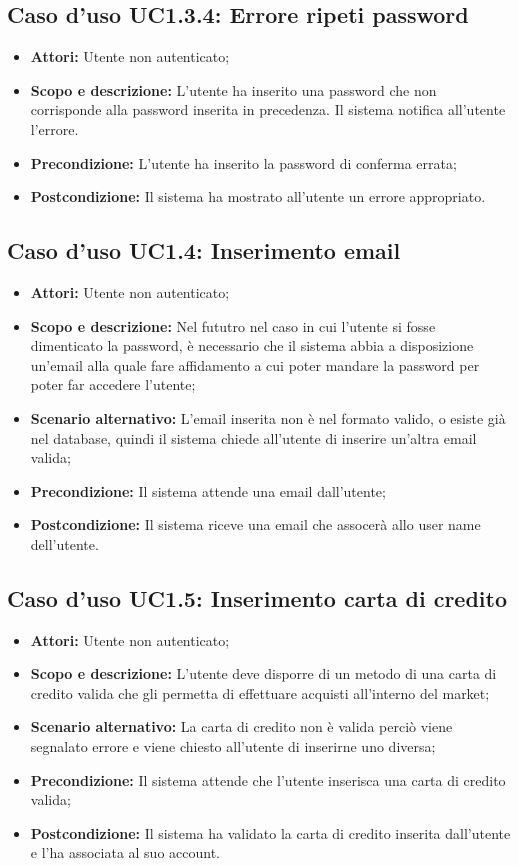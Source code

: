\documentclass[12pt,a4paper,titlepage]{article}
\begin{document}
	\subsection{Caso d'uso UC1.3.4: Errore ripeti password}
	\label{UC1.3.4}
	\begin{itemize}
		\item \textbf{Attori: }Utente non autenticato;
		\item \textbf{Scopo e descrizione: }L'utente ha inserito una password che non corrisponde alla password inserita in precedenza. Il sistema notifica all'utente l'errore.
		\item \textbf{Precondizione: }L'utente ha inserito la password di conferma errata;
		\item \textbf{Postcondizione: }Il sistema ha mostrato all'utente un errore appropriato.
	\end{itemize}
	\subsection{Caso d'uso UC1.4: Inserimento email}
	\label{UC1.4}
	\begin{itemize}
		\item \textbf{Attori: }Utente non autenticato;
		\item \textbf{Scopo e descrizione: }Nel fututro nel caso in cui l'utente si fosse dimenticato la password, è necessario che il sistema abbia a disposizione un'email alla quale fare affidamento a cui poter mandare la password per poter far accedere l'utente;
		\item \textbf{Scenario alternativo: }L'email inserita non è nel formato valido, o esiste già nel database, quindi il sistema chiede all'utente di inserire un'altra email valida;
		\item \textbf{Precondizione: }Il sistema attende una email dall'utente;
		\item \textbf{Postcondizione: }Il sistema riceve una email che assocerà allo user name dell'utente.
	\end{itemize}
	\subsection{Caso d'uso UC1.5: Inserimento carta di credito}
	\label{UC1.5}
	\begin{itemize}
		\item \textbf{Attori: }Utente non autenticato;
		\item \textbf{Scopo e descrizione: }L'utente deve disporre di un metodo di una carta di credito valida che gli permetta di effettuare acquisti all'interno del market;
		\item \textbf{Scenario alternativo: }La carta di credito non è valida perciò viene segnalato errore e viene chiesto all'utente di inserirne uno diversa;
		\item \textbf{Precondizione: }Il sistema attende che l'utente inserisca una carta di credito valida;
		\item \textbf{Postcondizione: }Il sistema ha validato la carta di credito inserita dall'utente e l'ha associata al suo account.
	\end{itemize}
\end{document}
